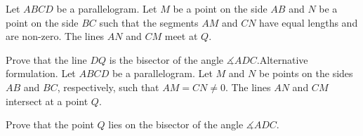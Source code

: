 Let $ABCD$ be a parallelogram. Let $M$ be a point on the side $AB$ and $N$ be a point on the side $BC$ such that the segments $AM$ and $CN$ have equal lengths and are non-zero. The lines $AN$ and $CM$ meet at $Q$.

Prove that the line $DQ$ is the bisector of the angle $\measuredangle ADC$.Alternative formulation. Let $ABCD$ be a parallelogram. Let $M$ and $N$ be points on the sides $AB$ and $BC$,  respectively, such that $AM=CN\neq 0$. The lines $AN$ and $CM$ intersect at a point $Q$.

Prove that the point $Q$ lies on the bisector of the angle $\measuredangle ADC$.